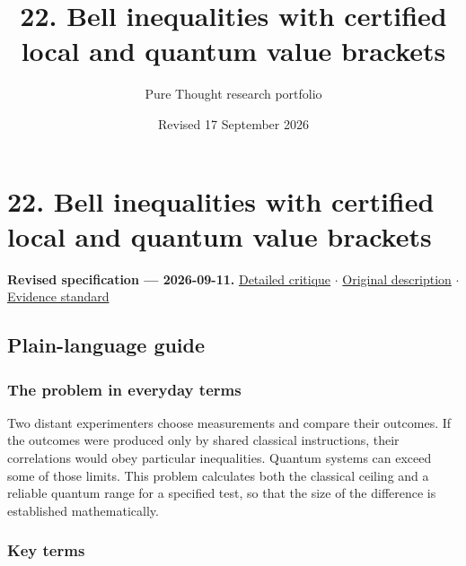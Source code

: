 \documentclass[
  11pt,
]{article}
\title{22. Bell inequalities with certified local and quantum value
brackets}
\author{Pure Thought research portfolio}
\date{Revised 17 September 2026}
\begin{document}
\maketitle
\thispagestyle{empty}
\clearpage

\section{22. Bell inequalities with certified local and quantum value
brackets}

\textbf{Revised specification --- 2026-09-11.}
\href{https://github.com/rick-stevens-ai/Pure-Thought/blob/main/reviews/22-Bell-Inequalities-Nonlocality.md}{Detailed
critique} \ensuremath{\cdot}
\href{https://github.com/rick-stevens-ai/Pure-Thought/blob/main/archive/original-PRDs/22-Bell-Inequalities-Nonlocality.md}{Original
description} \ensuremath{\cdot}
\href{https://github.com/rick-stevens-ai/Pure-Thought/blob/main/reviews/EVIDENCE-STANDARD.md}{Evidence
standard}

\subsection{Plain-language guide}

\subsubsection{The problem in everyday terms}

Two distant experimenters choose measurements and compare their
outcomes. If the outcomes were produced only by shared classical
instructions, their correlations would obey particular inequalities.
Quantum systems can exceed some of those limits. This problem calculates
both the classical ceiling and a reliable quantum range for a specified
test, so that the size of the difference is established mathematically.

\subsubsection{Key terms}
\end{document}

